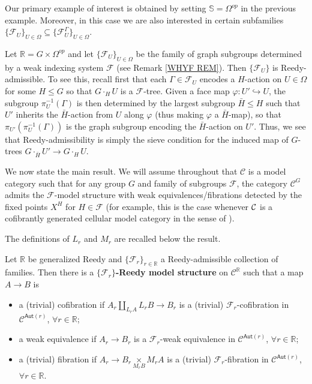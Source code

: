 \documentclass[a4paper,10pt
,draft
]{article}%
\begin{document}
Our primary example of interest is obtained by setting
$\mathbb{S} = \Omega^{op}$ in the previous example.
Moreover, in this case we are also interested 
in certain subfamilies
$\{\mathcal{F}_U\}_{U \in \Omega}
\subseteq
\{\mathcal{F}_U^{\Gamma}\}_{U \in \Omega}$.


\begin{example}\label{FGRAPHREEDY EX}
	Let $\mathbb{R} = G \times \Omega^{op}$ and let
	$\{\mathcal{F}_U\}_{U \in \Omega}$ be the family of graph subgroups determined by a weak indexing system $\mathcal{F}$ (see Remark \ref{WHYF REM}).
	Then $\{\mathcal{F}_U\}$ is Reedy-admissible.
	To see this, recall first that each $\Gamma \in \mathcal{F}_U$ encodes 
	a $H$-action on $U \in \Omega$ for some $H \leq G$
	so that $G \cdot_H U$ is a $\mathcal{F}$-tree.
	Given a face map $\varphi \colon U' \hookrightarrow U$, 
	the subgroup $\pi^{-1}_U(\Gamma)$ is then determined by the largest subgroup $\bar{H}\leq H$ such that 
	$U'$ inherits the $\bar{H}$-action from $U$ along $\varphi$ (thus making $\varphi$ a $\bar{H}$-map), 
	so that $\pi_{U'}(\pi^{-1}_U(\Gamma))$ is the graph subgroup encoding the $\bar{H}$-action on $U'$.
	Thus, we see that Reedy-admissibility is simply the sieve condition for the induced map of $G$-trees
	$G \cdot_{\bar{H}} U' \to G \cdot_H U$.
\end{example}


We now state the main result.
We will assume throughout that $\mathcal{C}$ is a model category such that for any group $G$ and family of subgroups $\mathcal{F}$,
the category $\mathcal{C}^G$ admits the
$\mathcal{F}$-model structure
with weak equivalences/fibrations detected by the fixed points
$X^H$ for $H \in \mathcal{F}$
(for example, this is the case whenever $\mathcal{C}$ is a cofibrantly generated cellular model category in the sense of \cite{Ste16}).

The definitions of $L_r$ and $M_r$ are recalled below the result.

\begin{theorem}\label{REEDYADM THM}
Let $\mathbb{R}$ be generalized Reedy and 
$\{\mathcal{F}_r\}_{r \in \mathbb{R}}$ a Reedy-admissible collection of families. 
Then there is a \textbf{$\{\mathcal{F}_r\}$-Reedy model structure} on
$\mathcal{C}^{\mathbb{R}}$ such that a map $A \to B$ is
\begin{itemize}
  \item a (trivial) cofibration if $A_r \underset{L_r A}{\amalg}L_r B \to B_r$ is a (trivial) $\mathcal{F}_r$-cofibration in $\mathcal{C}^{\mathsf{Aut}(r)}$, $\forall r \in \mathbb{R}$;
	\item a weak equivalence if $A_r \to B_r$ is a $\mathcal{F}_r$-weak equivalence in $\mathcal{C}^{\mathsf{Aut}(r)}$, $\forall r \in \mathbb{R}$;
	\item a (trivial) fibration if $A_r \to B_r \underset{M_r B}{\times }M_r A $ is a (trivial) $\mathcal{F}_r$-fibration in $\mathcal{C}^{\mathsf{Aut}(r)}$, $\forall r \in \mathbb{R}$.
\end{itemize}
\end{theorem}
\end{document}
